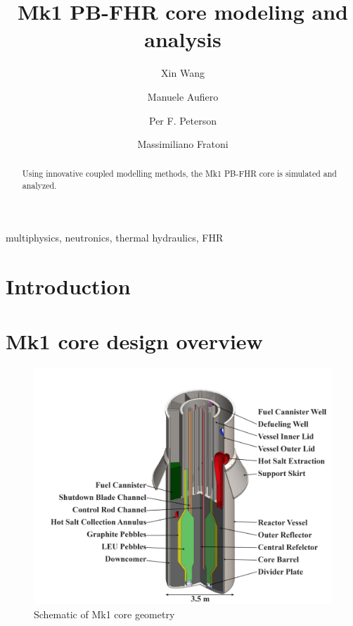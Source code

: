 \documentclass{elsarticle}
\begin{document}
\begin{frontmatter}

\title{Mk1 PB-FHR core modeling and analysis}
 
\author[ucb]{Xin Wang } 
\author{Manuele Aufiero}
\author{Per F. Peterson}
\author{Massimiliano Fratoni}
\address[ucb]{University of California, Berkeley, Department of Nuclear Engineering, Berkeley, CA 94720-1730 USA}


\begin{abstract}
Using innovative coupled modelling methods, the Mk1 PB-FHR core is simulated and analyzed. 

\end{abstract}

\begin{keyword}
  multiphysics, neutronics, thermal hydraulics, FHR
\end{keyword}

\end{frontmatter}


\section{Introduction}
\label{sec:introduction}




\section{Mk1 core design overview}
\label{sec:Mk1_design}



\begin{figure}
   \centering
  \includegraphics[width=\textwidth]{./images/design/Mk1_core_design.png}
  \caption{Schematic of Mk1 core geometry}
  \label{fig:Mk1_geom}
\end{figure}
\end{document}
